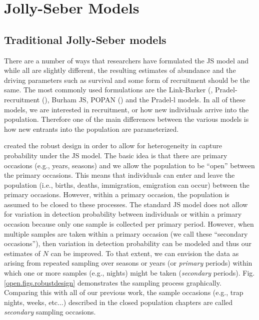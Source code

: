 \section{Jolly-Seber Models}

\subsection{Traditional Jolly-Seber models}
There are a number of ways that researchers have
formulated the JS model and while
all are slightly different, 
the resulting estimates of abundance and the driving parameters such
as survival and some form of recruitment should be the same.  
The most commonly used formulations are the
Link-Barker (\citep{link_barker:2005}, Pradel-recruitment (\citep{pradel:1996}), Burham JS, 
POPAN (\citep{schwarz_arnason:1996}) and the Pradel-l models.
In all of these models, we are interested
in recruitment, or how new individuals arrive into the population.
Therefore one of the main differences between
the various models is how new entrants into the population are parameterized.


\citet{pollock:1982} created the robust design in order to allow for heterogeneity in capture probability
under the JS model.
The basic idea is that there are primary occasions (e.g., years, seasons) and we
allow the population to be ``open'' between the primary occasions.  This means that individuals can enter
and leave the population (i.e., births, deaths, immigration,
emigration can occur) between the primary occasions.
However, within a primary occasion, the population is assumed to be
closed to these processes.
The standard JS model 
does not allow for variation in detection probability between individuals or within
a primary occasion because only one sample is collected per primary
period.
However, when multiple samples are taken within a primary
occasion (we call these ``secondary occasions''), then variation in detection probability can be modeled and thus
our estimates of $N$ can be improved.  To
that extent, we can envision the data as arising from repeated
sampling over seasons or years (or {\it primary} periods) within which
one or more samples (e.g., nights) might be taken ({\it secondary}
periods). Fig. \ref{open.figs.robustdesign} demonstrates the sampling process graphically.
Comparing this with all of our previous work, the sample
occasions %
(e.g., trap nights, weeks, etc$\dots$) described in the closed
population chapters are 
called {\it secondary} sampling occasions. 



